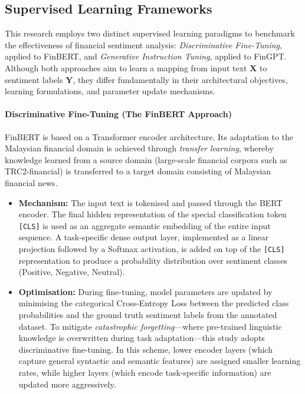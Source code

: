 \documentclass[singlespace]{ucetd}
\begin{document}
\subsection{Supervised Learning Frameworks}

This research employs two distinct supervised learning paradigms to benchmark the effectiveness of financial sentiment analysis: \emph{Discriminative Fine-Tuning}, applied to FinBERT, and \emph{Generative Instruction Tuning}, applied to FinGPT. Although both approaches aim to learn a mapping from input text $\mathbf{X}$ to sentiment labels $\mathbf{Y}$, they differ fundamentally in their architectural objectives, learning formulations, and parameter update mechanisms.

\paragraph{Discriminative Fine-Tuning (The FinBERT Approach)}

FinBERT is based on a Transformer encoder architecture. Its adaptation to the Malaysian financial domain is achieved through \emph{transfer learning}, whereby knowledge learned from a source domain (large-scale financial corpora such as TRC2-financial) is transferred to a target domain consisting of Malaysian financial news.

\begin{itemize}
    \item \textbf{Mechanism:}  
    The input text is tokenised and passed through the BERT encoder. The final hidden representation of the special classification token \texttt{[CLS]} is used as an aggregate semantic embedding of the entire input sequence. A task-specific dense output layer, implemented as a linear projection followed by a Softmax activation, is added on top of the \texttt{[CLS]} representation to produce a probability distribution over sentiment classes (Positive, Negative, Neutral).

    \item \textbf{Optimisation:}  
    During fine-tuning, model parameters are updated by minimising the categorical Cross-Entropy Loss between the predicted class probabilities and the ground truth sentiment labels from the annotated dataset. To mitigate \emph{catastrophic forgetting}—where pre-trained linguistic knowledge is overwritten during task adaptation—this study adopts discriminative fine-tuning. In this scheme, lower encoder layers (which capture general syntactic and semantic features) are assigned smaller learning rates, while higher layers (which encode task-specific information) are updated more aggressively.
\end{itemize}
\end{document}
